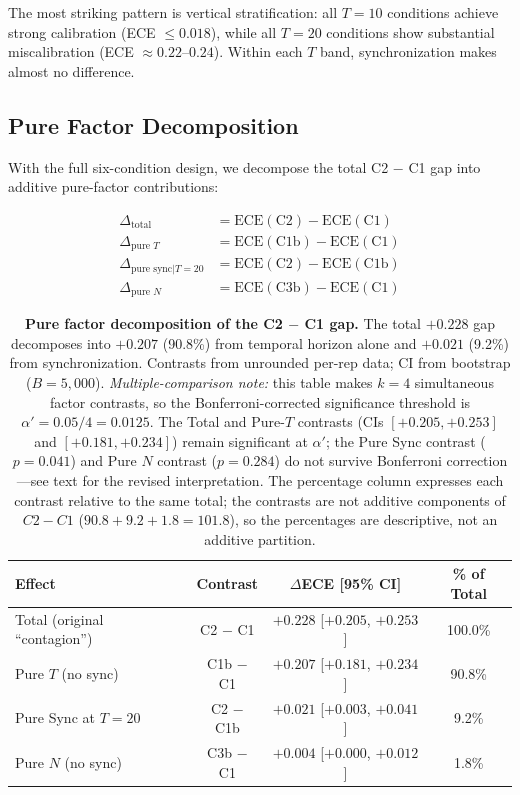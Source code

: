 \documentclass[11pt]{article}
\begin{document}
The most striking pattern is vertical stratification: all $T{=}10$ conditions achieve strong calibration (ECE $\leq 0.018$), while all $T{=}20$ conditions show substantial miscalibration (ECE $\approx 0.22$--$0.24$). Within each $T$ band, synchronization makes almost no difference.

\subsection{Pure Factor Decomposition}

With the full six-condition design, we decompose the total C2 $-$ C1 gap into additive pure-factor contributions:

\begin{align}
\Delta_{\text{total}} &= \text{ECE}(\text{C2}) - \text{ECE}(\text{C1}) \\
\Delta_{\text{pure }T} &= \text{ECE}(\text{C1b}) - \text{ECE}(\text{C1}) \\
\Delta_{\text{pure sync}|T=20} &= \text{ECE}(\text{C2}) - \text{ECE}(\text{C1b}) \\
\Delta_{\text{pure }N} &= \text{ECE}(\text{C3b}) - \text{ECE}(\text{C1})
\end{align}

\begin{table}[t]
\centering
\caption{\textbf{Pure factor decomposition of the C2 $-$ C1 gap.} The total $+0.228$ gap decomposes into $+0.207$ (90.8\%) from temporal horizon alone and $+0.021$ (9.2\%) from synchronization. Contrasts from unrounded per-rep data; CI from bootstrap ($B{=}5{,}000$). \emph{Multiple-comparison note:} this table makes $k{=}4$ simultaneous factor contrasts, so the Bonferroni-corrected significance threshold is $\alpha' = 0.05/4 = 0.0125$. The Total and Pure-$T$ contrasts (CIs $[+0.205, +0.253]$ and $[+0.181, +0.234]$) remain significant at $\alpha'$; the Pure Sync contrast ($p{=}0.041$) and Pure $N$ contrast ($p{=}0.284$) do not survive Bonferroni correction---see text for the revised interpretation. The percentage column expresses each contrast relative to the same total; the contrasts are not additive components of $C2-C1$ ($90.8+9.2+1.8=101.8$), so the percentages are descriptive, not an additive partition.}
\label{tab:decomposition}
\begin{tabular}{lccc}
\toprule
Effect & Contrast & $\Delta$ECE [95\% CI] & \% of Total \\
\midrule
Total (original ``contagion'') & C2 $-$ C1  & $+0.228$ [$+0.205$, $+0.253$] & 100.0\% \\
Pure $T$ (no sync)             & C1b $-$ C1 & $+0.207$ [$+0.181$, $+0.234$] & 90.8\%  \\
Pure Sync at $T{=}20$          & C2 $-$ C1b & $+0.021$ [$+0.003$, $+0.041$] & 9.2\%   \\
Pure $N$ (no sync)             & C3b $-$ C1 & $+0.004$ [$+0.000$, $+0.012$] & 1.8\%   \\
\bottomrule
\end{tabular}
\end{table}
\end{document}
